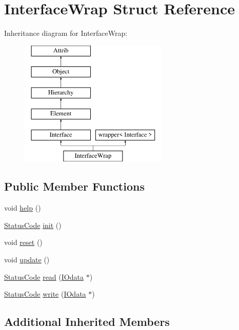 \hypertarget{structInterfaceWrap}{}\section{Interface\+Wrap Struct Reference}
\label{structInterfaceWrap}
Inheritance diagram for Interface\+Wrap\+:\begin{figure}[H]
\begin{center}
\leavevmode
\includegraphics[height=6.000000cm]{structInterfaceWrap}
\end{center}
\end{figure}
\subsection*{Public Member Functions}
\begin{DoxyCompactItemize}
\item 
void \hyperlink{structInterfaceWrap_abcf87065a7b9099a7d05e7c0ddaf2487}{help} ()
\item 
\hyperlink{classStatusCode}{Status\+Code} \hyperlink{structInterfaceWrap_a2660ecdfbabd91d99d7b64c83e92f33c}{init} ()
\item 
void \hyperlink{structInterfaceWrap_a6c350b2f44c579187e6e4269cae29bae}{reset} ()
\item 
void \hyperlink{structInterfaceWrap_aee2f0407da52a1de8659b1d83af62238}{update} ()
\item 
\hyperlink{classStatusCode}{Status\+Code} \hyperlink{structInterfaceWrap_a4dd40213e6d37c73521450aa0c7a8f4d}{read} (\hyperlink{classIOdata}{I\+Odata} $\ast$)
\item 
\hyperlink{classStatusCode}{Status\+Code} \hyperlink{structInterfaceWrap_afbf6658c8be109e72f38d61438ec94d3}{write} (\hyperlink{classIOdata}{I\+Odata} $\ast$)
\end{DoxyCompactItemize}
\subsection*{Additional Inherited Members}


